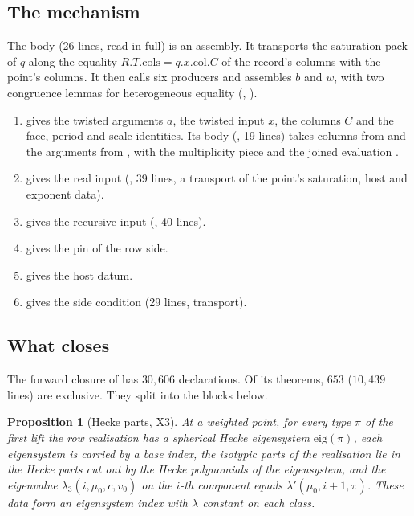 \documentclass[11pt]{article}
\newtheorem{proposition}[theorem]{Proposition}
\theoremstyle{remark}
\begin{document}
\subsection{The mechanism}

The body (26 lines, read in full) is an assembly. It transports the saturation pack of $q$ along the equality $R.T.\mathrm{cols}=q.x.\mathrm{col}.C$ of the record's columns with the point's columns. It then calls six producers and assembles $b$ and $w$, with two congruence lemmas for heterogeneous equality (, ).
\begin{enumerate}[nosep]
\item {} gives the twisted arguments $a$, the twisted input $x$, the columns $C$ and the face, period and scale identities. Its body (, 19 lines) takes columns from  and the arguments from , with the multiplicity piece  and the joined evaluation .
\item {} gives the real input (, 39 lines, a transport of the point's saturation, host and exponent data).
\item {} gives the recursive input (, 40 lines).
\item {} gives the pin of the row side.
\item {} gives the host datum.
\item {} gives the side condition (29 lines, transport).
\end{enumerate}

\subsection{What closes}

The forward closure of  has $30{,}606$ declarations. Of its theorems, $653$ ($10{,}439$ lines) are exclusive. They split into the blocks below.

\begin{proposition}[Hecke parts, X3]\label{prop:parts}
At a weighted point, for every type $\pi$ of the first lift the row realisation has a spherical Hecke eigensystem $\mathrm{eig}(\pi)$, each eigensystem is carried by a base index, the isotypic parts of the realisation lie in the Hecke parts cut out by the Hecke polynomials of the eigensystem, and the eigenvalue $\lambda_3(i,\mu_0,c,v_0)$ on the $i$-th component equals $\lambda'(\mu_0,i+1,\pi)$. These data form an eigensystem index with $\lambda$ constant on each class.
\end{proposition}
\end{document}
